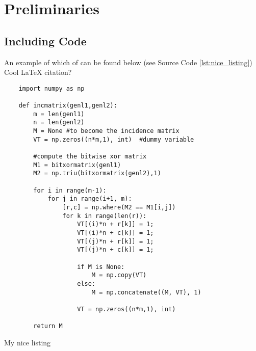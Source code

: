 \chapter{Preliminaries}
\label{chapter:preliminaries}

\section{Including Code}

An example of which of can be found below (see Source Code \ref{lst:nice_listing})
Cool \LaTeX \cite{latex} citation?
\begin{listing}
    \begin{verbatim}
    import numpy as np

    def incmatrix(genl1,genl2):
        m = len(genl1)
        n = len(genl2)
        M = None #to become the incidence matrix
        VT = np.zeros((n*m,1), int)  #dummy variable

        #compute the bitwise xor matrix
        M1 = bitxormatrix(genl1)
        M2 = np.triu(bitxormatrix(genl2),1)

        for i in range(m-1):
            for j in range(i+1, m):
                [r,c] = np.where(M2 == M1[i,j])
                for k in range(len(r)):
                    VT[(i)*n + r[k]] = 1;
                    VT[(i)*n + c[k]] = 1;
                    VT[(j)*n + r[k]] = 1;
                    VT[(j)*n + c[k]] = 1;

                    if M is None:
                        M = np.copy(VT)
                    else:
                        M = np.concatenate((M, VT), 1)

                    VT = np.zeros((n*m,1), int)

        return M
    \end{verbatim}

  \caption{My nice listing}
  \label{lst:nice_listing}
\end{listing}
